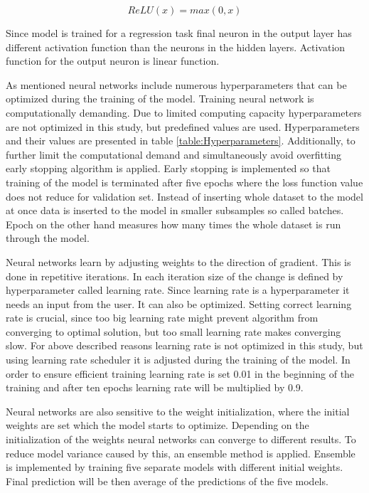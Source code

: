 \documentclass{article}
\begin{document}
\begin{equation}
\label{ReLU}
ReLU(x) = max(0, x)
\end{equation}

Since model is trained for a regression task final neuron in the output layer has different activation function than the neurons in the hidden layers. Activation function for the output neuron is linear function. 

As mentioned neural networks include numerous hyperparameters that can be optimized during the training of the model. Training neural network is computationally demanding. Due to limited computing capacity hyperparameters are not optimized in this study, but predefined values are used. Hyperparameters and their values are presented in table \ref{table:Hyperparameters}. Additionally, to further limit the computational demand and simultaneously avoid overfitting early stopping algorithm is applied. Early stopping is implemented so that training of the model is terminated after five epochs where the loss function value does not reduce for validation set. Instead of inserting whole dataset to the model at once data is inserted to the model in smaller subsamples so called batches. Epoch on the other hand measures how many times the whole dataset is run through the model. 

Neural networks learn by adjusting weights to the direction of gradient. This is done in repetitive iterations. In each iteration size of the change is defined by hyperparameter called learning rate. Since learning rate is a hyperparameter it needs an input from the user. It can also be optimized. Setting correct learning rate is crucial, since too big learning rate might prevent algorithm from converging to optimal solution, but too small learning rate makes converging slow. For above described reasons learning rate is not optimized in this study, but using learning rate scheduler it is adjusted during the training of the model. In order to ensure efficient training learning rate is set 0.01 in the beginning of the training and after ten epochs learning rate will be multiplied by 0.9.

Neural networks are also sensitive to the weight initialization, where the initial weights are set which the model starts to optimize. Depending on the initialization of the weights neural networks can converge to different results. To reduce model variance caused by this, an ensemble method is applied. Ensemble is implemented by training five separate models with different initial weights. Final prediction will be then average of the predictions of the five models.
\end{document}
